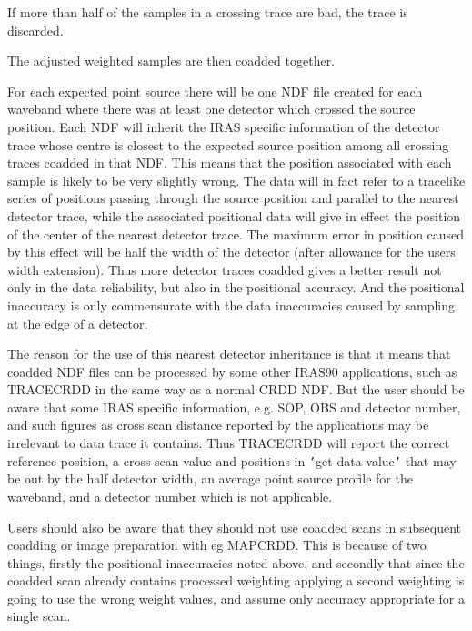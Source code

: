 \begin{small}
{{      If more than half of the samples in a crossing trace are bad, the trace
      is discarded.

      The adjusted weighted samples are then coadded together.

      For each expected point source there will be one NDF file created
      for each waveband where there was at least one detector which crossed
      the source position. Each NDF will inherit the IRAS specific information
      of the detector trace whose centre is closest to the expected source
      position among all crossing traces coadded in that NDF. This means
      that the position associated with each sample is likely to be very
      slightly wrong. The data will in fact refer to a tracelike series of
      positions passing through the source position and parallel to the
      nearest detector trace, while the associated positional data will give
      in effect the position of the center of the nearest detector trace. The
      maximum error in position caused by this effect will be half the width
      of the detector (after allowance for the users width extension).
      Thus more detector traces coadded gives a better result not only in
      the data reliability, but also in the positional accuracy. And the
      positional inaccuracy is only commensurate with the data inaccuracies
      caused by sampling at the edge of a detector.

      The reason for the use of this nearest detector inheritance is that
      it means that coadded NDF files can be processed by some other IRAS90
      applications, such as TRACECRDD in the same way as a normal CRDD NDF.
      But the user should be aware that some IRAS specific information, e.g.
      SOP, OBS and detector number, and such figures as cross scan distance
      reported by the applications may be irrelevant to data trace it contains.
      Thus TRACECRDD will report the correct reference position, a cross scan
      value and positions in {\tt '}get data value{\tt '} that may be out by the half
      detector width, an average point source profile for the waveband, and
      a detector number which is not applicable.

      Users should also be aware that they should not use coadded scans in
      subsequent coadding or image preparation with eg MAPCRDD. This is because
      of two things, firstly the positional inaccuracies noted above, and
      secondly that since the coadded scan already contains processed weighting
      applying a second weighting is going to use the wrong weight values, and
      assume only accuracy appropriate for a single scan.

}}
\end{small}
